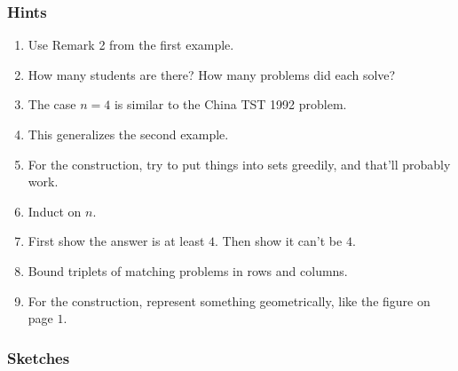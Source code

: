 \documentclass[11pt,paper=letter]{scrartcl}
\begin{document}
\subsubsection*{Hints}

\begin{enumerate}
\item \label{h:6} Use Remark 2 from the first example.
\item \label{h:7} How many students are there? How many problems did each solve?
\item \label{h:4} The case $n = 4$ is similar to the China TST 1992 problem.
\item \label{h:1} This generalizes the second example.
\item \label{h:3} For the construction, try to put things into sets greedily, and that'll probably work.
\item \label{h:5} Induct on $n$.
\item \label{h:8} First show the answer is at least $4$. Then show it can't be $4$.
\item \label{h:9} Bound triplets of matching problems in rows and columns.
\item \label{h:2} For the construction, represent something geometrically, like the figure on page $1$.
\end{enumerate}

\subsubsection*{Sketches}
\end{document}
